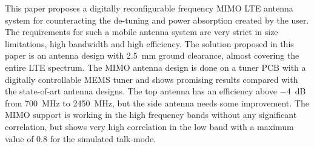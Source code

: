 This paper proposes a digitally reconfigurable frequency MIMO LTE antenna system for counteracting the de-tuning and power absorption created by the user. The requirements for such a mobile antenna system are very strict in size limitations, high bandwidth and high efficiency. The solution proposed in this paper is an antenna design with \SI{2.5}{mm} ground clearance, almost covering the entire LTE spectrum. 
The MIMO antenna design is done on a tuner PCB with a digitally controllable MEMS tuner and shows promising results compared with the state-of-art antenna designs. The top antenna has an efficiency above \SI{-4}{dB} from \SI{700}{MHz} to \SI{2450}{MHz}, but the side antenna needs some improvement. 
The MIMO support is working in the high frequency bands without any significant correlation, but shows very high correlation in the low band with a maximum value of \num{0.8} for the simulated talk-mode. 

% 
% 
% 
% 
% 
% 

